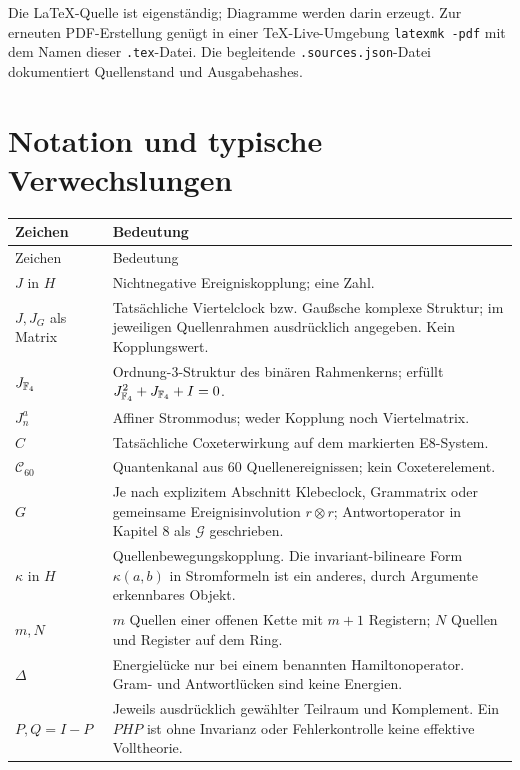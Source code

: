 Die LaTeX-Quelle ist eigenständig; Diagramme werden darin erzeugt. Zur erneuten PDF-Erstellung genügt in einer TeX-Live-Umgebung \texttt{latexmk -pdf} mit dem Namen dieser \texttt{.tex}-Datei. Die begleitende \texttt{.sources.json}-Datei dokumentiert Quellenstand und Ausgabehashes.

\section{Notation und typische Verwechslungen}
\begin{longtable}{@{}P{.2\textwidth}P{.72\textwidth}@{}}
\toprule Zeichen & Bedeutung\\\midrule\endfirsthead
\toprule Zeichen & Bedeutung\\\midrule\endhead
$J$ in $H$ & Nichtnegative Ereigniskopplung; eine Zahl.\\
$J,J_G$ als Matrix & Tatsächliche Viertelclock bzw. Gaußsche komplexe Struktur; im jeweiligen Quellenrahmen ausdrücklich angegeben. Kein Kopplungswert.\\
$J_{\mathbb F_4}$ & Ordnung-3-Struktur des binären Rahmenkerns; erfüllt $J_{\mathbb F_4}^2+J_{\mathbb F_4}+I=0$.\\
$J_n^a$ & Affiner Strommodus; weder Kopplung noch Viertelmatrix.\\
$C$ & Tatsächliche Coxeterwirkung auf dem markierten E8-System.\\
$\mathcal C_{60}$ & Quantenkanal aus 60 Quellenereignissen; kein Coxeterelement.\\
$G$ & Je nach explizitem Abschnitt Klebeclock, Grammatrix oder gemeinsame Ereignisinvolution $r\otimes r$; Antwortoperator in Kapitel 8 als $\mathcal G$ geschrieben.\\
$\kappa$ in $H$ & Quellenbewegungskopplung. Die invariant-bilineare Form $\kappa(a,b)$ in Stromformeln ist ein anderes, durch Argumente erkennbares Objekt.\\
$m,N$ & $m$ Quellen einer offenen Kette mit $m+1$ Registern; $N$ Quellen und Register auf dem Ring.\\
$\Delta$ & Energielücke nur bei einem benannten Hamiltonoperator. Gram- und Antwortlücken sind keine Energien.\\
$P,Q=I-P$ & Jeweils ausdrücklich gewählter Teilraum und Komplement. Ein $PHP$ ist ohne Invarianz oder Fehlerkontrolle keine effektive Volltheorie.\\\bottomrule
\end{longtable}

\appendix

